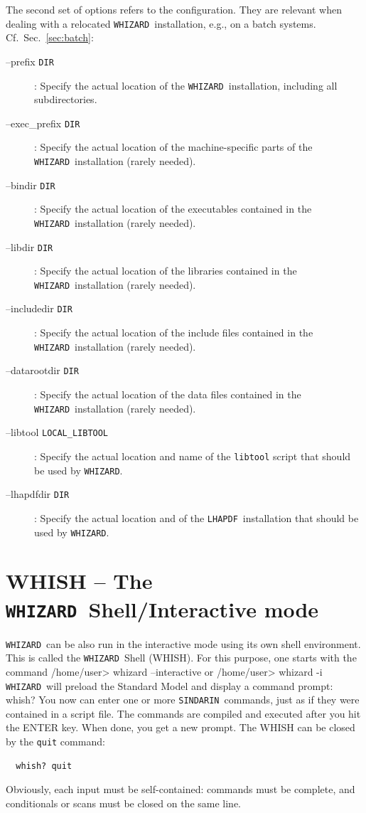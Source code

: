 \documentclass[12pt]{book}
\newenvironment{interaction}%
  {\begingroup\small
   \verbatim}%
  {\endverbatim
   \endgroup\noindent}
\newcommand{\ttt}[1]{\texttt{#1}}
\newcommand{\whizard}{\texttt{WHIZARD}}
\newcommand{\lhapdf}{\texttt{LHAPDF}}
\newcommand{\sindarin}{\texttt{SINDARIN}}
\begin{document}
The second set of options refers to the configuration.  They are
relevant when dealing with a relocated \whizard\ installation, e.g.,
on a batch systems.  Cf.\ Sec.~\ref{sec:batch}:
\begin{description}
\item[--prefix \ttt{DIR}]: Specify the actual location of the \whizard\
  installation, including all subdirectories.
\item[--exec\_prefix \ttt{DIR}]:  Specify the actual location of the
  machine-specific parts of the \whizard\ installation (rarely needed).
\item[--bindir \ttt{DIR}]:  Specify the actual location of the
  executables contained in the \whizard\ installation (rarely needed).
\item[--libdir \ttt{DIR}]:  Specify the actual location of the
  libraries contained in the \whizard\ installation (rarely needed).
\item[--includedir \ttt{DIR}]:  Specify the actual location of the
  include files contained in the \whizard\ installation (rarely needed).
\item[--datarootdir \ttt{DIR}]:  Specify the actual location of the
  data files contained in the \whizard\ installation (rarely needed).
\item[--libtool \ttt{LOCAL\_LIBTOOL}]:  Specify the actual location and
  name of the \ttt{libtool} script that should be used by \whizard.
\item[--lhapdfdir \ttt{DIR}]:  Specify the actual location and
  of the \lhapdf\ installation that should be used by \whizard.
\end{description}



\section{WHISH -- The \whizard\ Shell/Interactive mode}
\label{sec:whish}

\whizard\ can be also run in the interactive mode using its own shell
environment. This is called the \whizard\ Shell (WHISH). For this
purpose, one starts with the command
\begin{interaction} 
  /home/user> whizard --interactive 
\end{interaction}
or
\begin{interaction} 
  /home/user> whizard -i 
\end{interaction} 
\whizard\ will preload the Standard Model and display a command
prompt:
\begin{interaction}
  whish?
\end{interaction}
You now can enter one or more \sindarin\ commands, just as if they
were contained in a script file.  The commands are compiled and
executed after you hit the ENTER key.  When done, you get a new
prompt.  The WHISH can be closed by the \texttt{quit} command:
\begin{verbatim}
  whish? quit
\end{verbatim}
Obviously, each input must be self-contained: commands must be
complete, and conditionals or scans must be closed on the same line.
\end{document}
